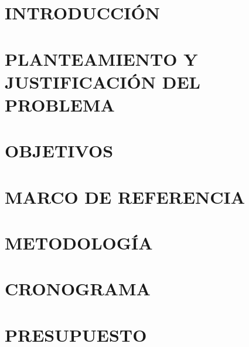 \documentclass[12pt]{article}
\begin{document}
    
    
    \tableofcontents
    \newpage
    \renewcommand{\numberline}{{Figura}~\oldnumberline }%
    \listoffigures
    \newpage
    \renewcommand{\numberline}{{Tabla}~\oldnumberline }%
    \listoftables
    \newpage
    
    \section{INTRODUCCIÓN}
    
    
    
    \section{PLANTEAMIENTO Y JUSTIFICACIÓN DEL PROBLEMA}
    
    
    \section{OBJETIVOS}
    
    
    \section{MARCO DE REFERENCIA}
    
    
    \section{METODOLOGÍA}
    
    
    \section{CRONOGRAMA}
    
    
    \section{PRESUPUESTO}
    
    
    
    
\end{document}
